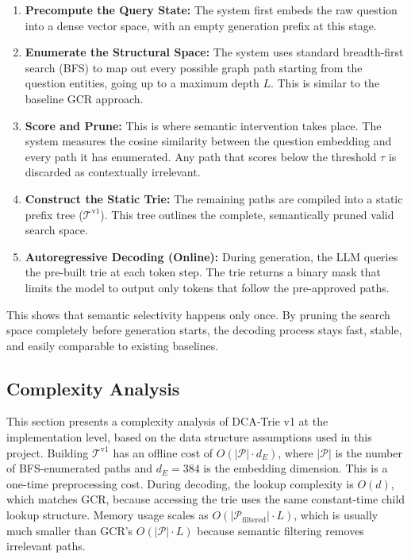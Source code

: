 \begin{enumerate}
  \item \textbf{Precompute the Query State:} The system first embeds the raw question into a dense vector space, with an empty generation prefix at this stage.
  \item \textbf{Enumerate the Structural Space:} The system uses standard breadth-first search (BFS) to map out every possible graph path starting from the question entities, going up to a maximum depth $L$. This is similar to the baseline GCR approach.
  \item \textbf{Score and Prune:} This is where semantic intervention takes place. The system measures the cosine similarity between the question embedding and every path it has enumerated. Any path that scores below the threshold $\tau$ is discarded as contextually irrelevant.
  \item \textbf{Construct the Static Trie:} The remaining paths are compiled into a static prefix tree ($\mathcal{T}^{\text{v1}}$). This tree outlines the complete, semantically pruned valid search space.
  \item \textbf{Autoregressive Decoding (Online):} During generation, the LLM queries the pre-built trie at each token step. The trie returns a binary mask that limits the model to output only tokens that follow the pre-approved paths.
\end{enumerate}

This shows that semantic selectivity happens only once. By pruning the search space completely before generation starts, the decoding process stays fast, stable, and easily comparable to existing baselines.





\subsection{Complexity Analysis}

This section presents a complexity analysis of DCA‑Trie v1 at the implementation level, based on the data structure assumptions used in this project. Building $\mathcal{T}^{\text{v1}}$ has an offline cost of $O(|\mathcal{P}| \cdot d_E)$, where $|\mathcal{P}|$ is the number of BFS-enumerated paths and $d_E = 384$ is the embedding dimension. This is a one-time preprocessing cost. During decoding, the lookup complexity is $O(d)$, which matches GCR, because accessing the trie uses the same constant-time child lookup structure. Memory usage scales as $O(|\mathcal{P}_{\text{filtered}}| \cdot L)$, which is usually much smaller than GCR's $O(|\mathcal{P}| \cdot L)$ because semantic filtering removes irrelevant paths.

